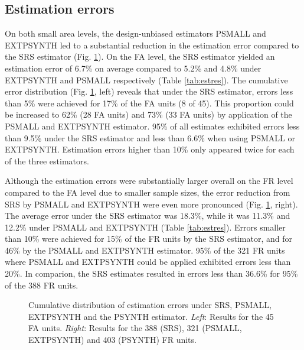 \documentclass[remotesensing,article,submit,moreauthors,pdftex,10pt,a4paper]{mdpi}
\newcommand{\psynth}{PSYNTH}
\newcommand{\psmall}{PSMALL}
\newcommand{\extpsynth}{EXTPSYNTH}
\begin{document}
\subsection{Estimation errors}
\label{sec:esterr}

On both small area levels, the design-unbiased estimators \psmall{} and \extpsynth{} led to a substantial reduction in the estimation error compared to the SRS estimator (Fig. \ref{fig:disterrors}). On the FA level, the SRS estimator yielded an estimation error of 6.7\% on average compared to 5.2\% and 4.8\% under \extpsynth{} and \psmall{} respectively (Table \ref{tab:estres}). The cumulative error distribution (Fig. \ref{fig:disterrors}, left) reveals that under the SRS estimator, errors less than 5\% were achieved for 17\% of the FA units (8 of 45). This proportion could be increased to 62\% (28 FA units) and 73\% (33 FA units) by application of the \psmall{} and \extpsynth{} estimator. 95\% of all estimates exhibited errors less than 9.5\% under the SRS estimator and less than 6.6\% when using \psmall{} or \extpsynth{}. Estimation errors higher than 10\% only appeared twice for each of the three estimators.\par
Although the estimation errors were substantially larger overall on the FR level compared to the FA level due to smaller sample sizes, the error reduction from SRS by \psmall{} and \extpsynth{} were even more pronounced (Fig. \ref{fig:disterrors}, right). The average error under the SRS estimator was 18.3\%, while it was 11.3\% and 12.2\% under \psmall{} and \extpsynth{} (Table \ref{tab:estres}). Errors smaller than 10\% were achieved for 15\% of the FR units by the SRS estimator, and for 46\% by the \psmall{} and \extpsynth{} estimator. 95\% of the 321 FR units where \psmall{} and \extpsynth{} could be applied exhibited errors less than 20\%. In comparion, the SRS estimates resulted in errors less than 36.6\% for 95\% of the 388 FR units.

\begin{figure}[H]
	\centering
	\caption{Cumulative distribution of estimation errors under SRS, \psmall{}, \extpsynth{} and the \psynth{} estimator. \textit{Left}: Results for the 45 FA units. \textit{Right}: Results for the 388 (SRS), 321 (\psmall{}, \extpsynth{}) and 403 (\psynth{}) FR units.}
	\label{fig:disterrors}
\end{figure}
\end{document}
